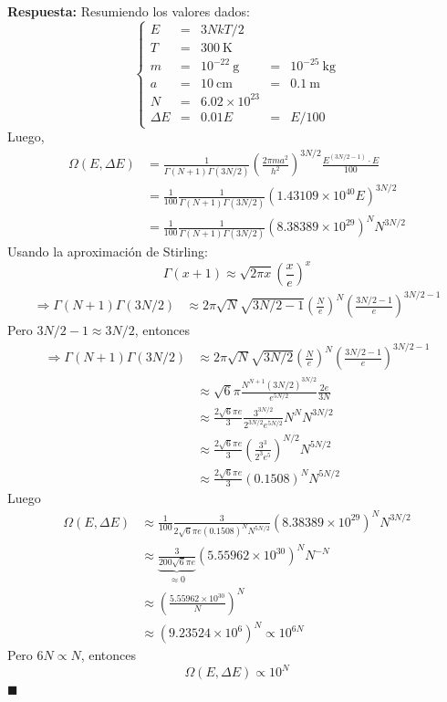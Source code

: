 \documentclass[]{article}
\numberwithin{equation}{section}
\newcommand{\0}{\textcolor{gray}{0}}
\newcommand{\qed}{\hfill\(\blacksquare\)}
\begin{document}
\textbf{Respuesta:}
Resumiendo los valores dados:
\begin{equation}
	\left\lbrace \begin{matrix}
		E &=& 3 N k T / 2\\
		T &=& 300 \mathrm{~K}\\
		m &=& 10^{-22} \mathrm{~g} &=& 10^{-25} \mathrm{~kg} \\
		a &=& 10 \mathrm{~cm} &=& 0.1 \mathrm{~m}\\
		N &=& 6.02 \times 10^{23}\\
		\Delta E &=& 0.01 E &=& E/100
	\end{matrix}\right. 
\end{equation}
Luego,
\begin{align*}
	\Omega(E, \Delta E) &= \frac{1}{\Gamma(N+1) \Gamma(3 N / 2)}\left(\frac{2 \pi m a^2}{h^2}\right)^{3 N / 2} \frac{E^{(3 N / 2-1)}\cdot E}{100}\\
	&= \frac{1}{100}\frac{1}{\Gamma(N+1) \Gamma(3 N / 2)}\left(1.43109\times 10^{40} E\right)^{3 N / 2}\\
	&= \frac{1}{100}\frac{1}{\Gamma(N+1) \Gamma(3 N / 2)}\left(8.38389\times 10^{29} \right)^{N}N^{3N/2}
\end{align*}
Usando la aproximación de Stirling:
\begin{equation}
	\Gamma(x + 1) \approx \sqrt{2\pi x}\left(\frac{x}{e}\right)^{x}
\end{equation}
\begin{align*}
	\Rightarrow \Gamma(N+1) \Gamma(3 N / 2) &\approx 2\pi \sqrt{N}\sqrt{3N/2 - 1} \left(\frac{N}{e}\right)^{N} \left(\frac{3N/2 - 1}{e}\right)^{3N/2 - 1}
\end{align*}
Pero \(3N/2 - 1\approx 3N/2\), entonces
\begin{align*}
	\Rightarrow \Gamma(N+1) \Gamma(3 N / 2) &\approx 2\pi \sqrt{N}\sqrt{3N/2} \left(\frac{N}{e}\right)^{N} \left(\frac{3N/2 - 1}{e}\right)^{3N/2 - 1}\\
	&\approx \sqrt{6}\pi\frac{N^{N + 1} (3N/2)^{3N/2}}{e^{5N/2}}\frac{2e}{3N}\\
	&\approx \frac{2\sqrt{6}\pi e}{3}\frac{3^{3N/2}}{2^{3N/2}e^{5N/2}}N^{N} N^{3N/2}\\
	&\approx \frac{2\sqrt{6}\pi e}{3}\left( \frac{3^{3}}{2^{3}e^{5}}\right)^{N/2}N^{5N/2}\\
	&\approx \frac{2\sqrt{6}\pi e}{3}\left(0.1508\right)^{N}N^{5N/2}
\end{align*}
Luego
\begin{align*}
	\Omega(E, \Delta E) &\approx \frac{1}{100}\frac{3}{2\sqrt{6}\pi e\left(0.1508\right)^{N}N^{5N/2}} \left(8.38389\times 10^{29} \right)^{N}N^{3N/2}\\
	&\approx \underbrace{\frac{3}{200\sqrt{6}\pi e}}_{\approx 0}\left(5.55962\times 10^{30} \right)^{N}N^{-N}\\
	&\approx \left(\frac{5.55962\times 10^{30}}{N} \right)^{N}\\
	&\approx \left(9.23524\times 10^6 \right)^{N}  \propto 10^{6N}
\end{align*}
Pero \(6N \propto N\), entonces
\begin{equation}
	\Omega(E, \Delta E) \propto 10^{N}
\end{equation}
\qed
\end{document}

